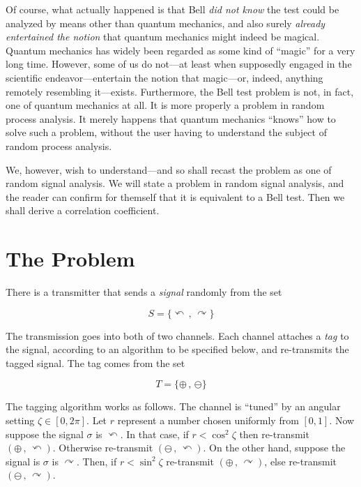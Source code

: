 \documentclass[9pt,technote]{IEEEtran}
\begin{document}
Of course, what actually happened is that Bell {\em{did not know}} the
test could be analyzed by means other than quantum mechanics, and also
surely {\em{already entertained the notion}} that quantum mechanics
might indeed be magical. Quantum mechanics has widely been regarded as
some kind of ``magic'' for a very long time. However, some of us do
not---at least when supposedly engaged in the scientific
endeavor---entertain the notion that magic---or, indeed, anything
remotely resembling it---exists. Furthermore, the Bell test problem is
not, in fact, one of quantum mechanics at all. It is more properly a
problem in random process analysis. It merely happens that quantum
mechanics ``knows'' how to solve such a problem, without the user
having to understand the subject of random process analysis.

We, however, wish to understand---and so shall recast the problem as
one of random signal analysis. We will state a problem in random
signal analysis, and the reader can confirm for themself that it is
equivalent to a Bell test. Then we shall derive a correlation
coefficient.

\section{The Problem}

There is a transmitter that sends a {\em{signal}} randomly from the
set

\begin{equation}
  S=\{\curvearrowleft\,,\,\curvearrowright\}
\end{equation}

The transmission goes into both of two channels. Each channel attaches
a {\em{tag}} to the signal, according to an algorithm to be specified
below, and re-transmits the tagged signal. The tag comes from the set

\begin{equation}
  T=\{\oplus\,,\,\ominus\}
\end{equation}

The tagging algorithm works as follows. The channel is ``tuned'' by an
angular setting $\zeta\in[0,2\pi]$. Let $r$ represent a number chosen
uniformly from $[0,1]$. Now suppose the signal $\sigma$ is
$\curvearrowleft$. In that case, if $r < \cos^2 \zeta$ then
re-transmit $(\oplus\,,\,\curvearrowleft)$. Otherwise re-transmit
$(\ominus\,,\,\curvearrowleft)$. On the other hand, suppose the signal
is $\sigma$ is $\curvearrowright$. Then, if $r < \sin^2 \zeta$
re-transmit $(\oplus\,,\,\curvearrowright)$, else re-transmit
$(\ominus\,,\,\curvearrowright)$.
\end{document}
